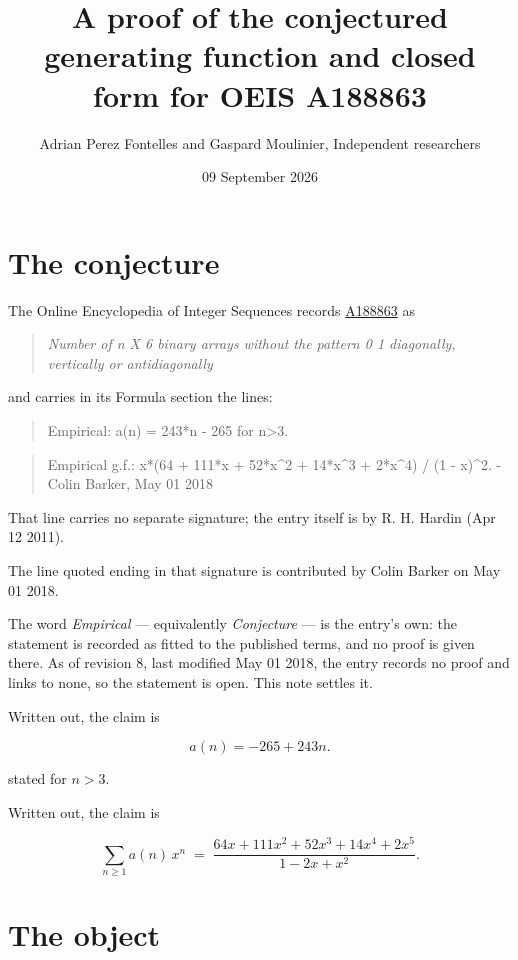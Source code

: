 \documentclass[11pt]{article}
\title{A proof of the conjectured generating function and closed form for OEIS A188863}
\author{Adrian Perez Fontelles and Gaspard Moulinier, Independent researchers}
\date{09 September 2026}
\theoremstyle{definition}
\begin{document}
\maketitle
\section{The conjecture}

The Online Encyclopedia of Integer Sequences records \href{https://oeis.org/A188863}{A188863} as

\begin{quote}\itshape Number of n X 6 binary arrays without the pattern 0 1 diagonally, vertically or antidiagonally\end{quote}

and carries in its Formula section the lines:

\begin{quote}\ttfamily Empirical: a(n) = 243*n - 265 for n>3.\end{quote}

\begin{quote}\ttfamily Empirical g.f.: x*(64 + 111*x + 52*x\textasciicircum{}2 + 14*x\textasciicircum{}3 + 2*x\textasciicircum{}4) / (1 - x)\textasciicircum{}2. - Colin Barker, May 01 2018\end{quote}

That line carries no separate signature; the entry itself is by R. H. Hardin (Apr 12 2011).

The line quoted ending in that signature is contributed by Colin Barker on May 01 2018.

The word {\itshape Empirical} --- equivalently {\itshape Conjecture} --- is the entry's own: the statement is recorded as fitted to the published terms, and no proof is given there. As of revision 8, last modified May 01 2018, the entry records no proof and links to none, so the statement is open. This note settles it.

Written out, the claim is

\[a(n) = -265 + 243n.\]

stated for $n > 3$.

Written out, the claim is

\[\sum_{n \ge 1} a(n)\,x^n \;=\; \frac{64x + 111x^{2} + 52x^{3} + 14x^{4} + 2x^{5}}{1 - 2x + x^{2}}.\]

\section{The object}
\end{document}
